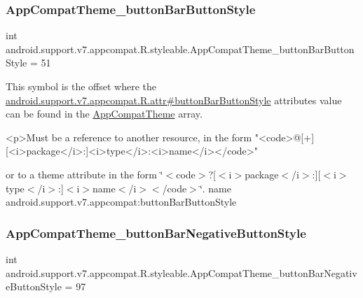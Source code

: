 \subsubsection{\texorpdfstring{App\+Compat\+Theme\+\_\+button\+Bar\+Button\+Style}{AppCompatTheme\_buttonBarButtonStyle}}
{\footnotesize\ttfamily int android.\+support.\+v7.\+appcompat.\+R.\+styleable.\+App\+Compat\+Theme\+\_\+button\+Bar\+Button\+Style = 51\hspace{0.3cm}{\ttfamily [static]}}

This symbol is the offset where the \hyperlink{classandroid_1_1support_1_1v7_1_1appcompat_1_1R_1_1attr_ac3b82cc76ec0827264fb6a5e4ec308b3}{android.\+support.\+v7.\+appcompat.\+R.\+attr\#button\+Bar\+Button\+Style} attribute\textquotesingle{}s value can be found in the \hyperlink{classandroid_1_1support_1_1v7_1_1appcompat_1_1R_1_1styleable_a5c42f89e8a410c323be34208d75c430b}{App\+Compat\+Theme} array.

\begin{DoxyVerb}      <p>Must be a reference to another resource, in the form "<code>@[+][<i>package</i>:]<i>type</i>:<i>name</i></code>"
\end{DoxyVerb}
 or to a theme attribute in the form \char`\"{}$<$code$>$?\mbox{[}$<$i$>$package$<$/i$>$\+:\mbox{]}\mbox{[}$<$i$>$type$<$/i$>$\+:\mbox{]}$<$i$>$name$<$/i$>$$<$/code$>$\char`\"{}.  name android.\+support.\+v7.\+appcompat\+:button\+Bar\+Button\+Style \mbox{\label{classandroid_1_1support_1_1v7_1_1appcompat_1_1R_1_1styleable_a99db68caf8feef60226a106581b9314e}} 
\subsubsection{\texorpdfstring{App\+Compat\+Theme\+\_\+button\+Bar\+Negative\+Button\+Style}{AppCompatTheme\_buttonBarNegativeButtonStyle}}
{\footnotesize\ttfamily int android.\+support.\+v7.\+appcompat.\+R.\+styleable.\+App\+Compat\+Theme\+\_\+button\+Bar\+Negative\+Button\+Style = 97\hspace{0.3cm}{\ttfamily [static]}}

